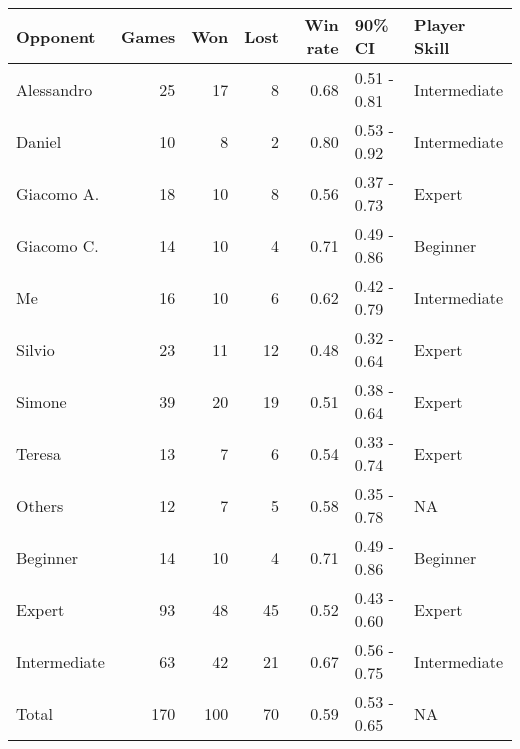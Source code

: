 \begin{tabular}{lrrrrll}
\toprule
    Opponent &  Games &  Won &  Lost &  Win rate &      90\% CI & Player Skill \\
\midrule
  Alessandro &            25 &   17 &     8 &      0.68 & 0.51 - 0.81 & Intermediate \\
      Daniel &            10 &    8 &     2 &      0.80 & 0.53 - 0.92 & Intermediate \\
  Giacomo A. &            18 &   10 &     8 &      0.56 & 0.37 - 0.73 &       Expert \\
  Giacomo C. &            14 &   10 &     4 &      0.71 & 0.49 - 0.86 &     Beginner \\
          Me &            16 &   10 &     6 &      0.62 & 0.42 - 0.79 & Intermediate \\
      Silvio &            23 &   11 &    12 &      0.48 & 0.32 - 0.64 &       Expert \\
      Simone &            39 &   20 &    19 &      0.51 & 0.38 - 0.64 &       Expert \\
      Teresa &            13 &    7 &     6 &      0.54 & 0.33 - 0.74 &       Expert \\
      Others &            12 &    7 &     5 &      0.58 & 0.35 - 0.78 &           NA \\
    Beginner &            14 &   10 &     4 &      0.71 & 0.49 - 0.86 &     Beginner \\
      Expert &            93 &   48 &    45 &      0.52 & 0.43 - 0.60 &       Expert \\
Intermediate &            63 &   42 &    21 &      0.67 & 0.56 - 0.75 & Intermediate \\
       Total &           170 &  100 &    70 &      0.59 & 0.53 - 0.65 &           NA \\
\bottomrule
\end{tabular}
